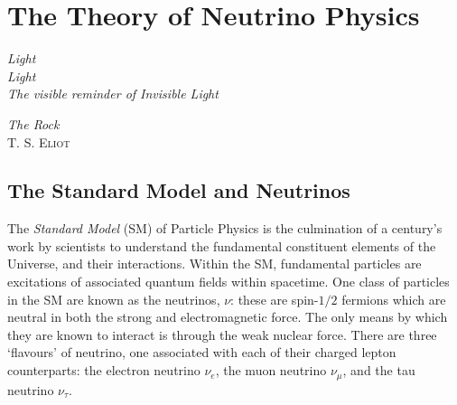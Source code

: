 
\chapter{The Theory of Neutrino Physics}\label{chap:theory}
\setlength{\epigraphwidth}{.45\textwidth}
\epigraph{\textit{Light\\Light\\The visible reminder of Invisible Light}}{\textit{The Rock}\\\textsc{T. S. Eliot}}
\setlength{\epigraphwidth}{.4\textwidth}

\section{The Standard Model and Neutrinos}
The \textit{Standard Model} (SM) of Particle Physics is the culmination of a century's work by scientists to understand the fundamental constituent elements of the Universe, and their interactions. Within the SM, fundamental particles are excitations of associated quantum fields within spacetime. One class of particles in the SM are known as the neutrinos, $\nu$: these are spin-$1/2$ fermions which are neutral in both the strong and electromagnetic force. The only means by which they are known to interact is through the weak nuclear force. There are three `flavours' of neutrino, one associated with each of their charged lepton counterparts: the electron neutrino $\nu_e$, the muon neutrino $\nu_\mu$, and the tau neutrino $\nu_\tau$.

